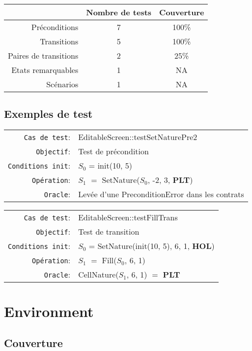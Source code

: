 \documentclass{article}
\begin{document}
\begin{longtable}{r|cc}
  &Nombre de tests&Couverture\\
  \hline
  Préconditions & 7 & 100\%\\
  Transitions & 5 & 100\%\\
  Paires de transitions & 2 & 25\%\\
  Etats remarquables & 1 & NA\\
  Scénarios & 1 & NA\\
\end{longtable}

\subsection{Exemples de test}

{\small
  \begin{longtable}{rl}
    \texttt{Cas de test}: &\textrm{EditableScreen::testSetNaturePre2}\\
    \texttt{Objectif}: & Test de précondition\\
    \texttt{Conditions init}: & $S_0$ = \textrm{init(10, 5)}\\
    \texttt{Opération}: &$S_1$ $=$ \textrm{SetNature($S_0$, -2, 3, \textbf{PLT})}\\
    \texttt{Oracle}: & Levée d'une \textrm{PreconditionError} dans les contrats\\
  \end{longtable}}

{\small
  \begin{longtable}{rl}
    \texttt{Cas de test}: &\textrm{EditableScreen::testFillTrans}\\
    \texttt{Objectif}: & Test de transition\\
    \texttt{Conditions init}: & $S_0$ = \textrm{SetNature(init(10, 5), 6, 1, \textbf{HOL})}\\
    \texttt{Opération}: &$S_1$ $=$ \textrm{Fill($S_0$, 6, 1)}\\
    \texttt{Oracle}: &\textrm{CellNature($S_1$, 6, 1)} $=$ \textbf{PLT}\\
  \end{longtable}}

\section{Environment}

\subsection{Couverture}
\end{document}
